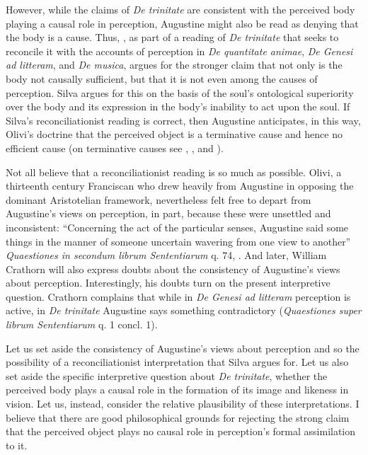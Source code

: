 \documentclass[12pt]{article}
\begin{document}
However, while the claims of \emph{De trinitate} are consistent with the perceived body playing a causal role in perception, Augustine might also be read as denying that the body is a cause. Thus, \citealt{Silva:2014bh}, as part of a reading of \emph{De trinitate} that seeks to reconcile it with the accounts of perception in \emph{De quantitate animae}, \emph{De Genesi ad litteram}, and \emph{De musica}, argues for the stronger claim that not only is the body not causally sufficient, but that it is not even among the causes of perception. Silva argues for this on the basis of the soul's ontological superiority over the body and its expression in the body's inability to act upon the soul. If Silva's \citeyearpar{Silva:2014bh} reconciliationist reading is correct, then Augustine anticipates, in this way, Olivi's doctrine that the perceived object is a terminative cause and hence no efficient cause (on terminative causes see \citealt[192--195]{Kent:1984zm}, \citealt[chapter 5.2]{Pasnau:1997aa}, and \citealt[chapter 6]{Toivanen:2013ul}).

Not all believe that a reconciliationist reading is so much as possible. Olivi, a thirteenth century Franciscan who drew heavily from Augustine in opposing the dominant Aristotelian framework, nevertheless felt free to depart from Augustine's views on perception, in part, because these were unsettled and inconsistent: ``Concerning the act of the particular senses, Augustine said some things in the manner of someone uncertain wavering from one view to another'' \emph{Quaestiones in secondum librum Sententiarum} q. 74, \citealt[131]{Pasnau:1997aa}. And later, William Crathorn will also express doubts about the consistency of Augustine's views about perception. Interestingly, his doubts turn on the present interpretive question. Crathorn complains that while in \emph{De Genesi ad litteram} perception is active, in \emph{De trinitate} Augustine says something contradictory (\emph{Quaestiones super librum Sententiarum} q. 1 concl. 1).

Let us set aside the consistency of Augustine's views about perception and so the possibility of a reconciliationist interpretation that Silva argues for. Let us also set aside the specific interpretive question about \emph{De trinitate}, whether the perceived body plays a causal role in the formation of its image and likeness in vision. Let us, instead, consider the relative plausibility of these interpretations.  I believe that there are good philosophical grounds for rejecting the strong claim that the perceived object plays no causal role in perception's formal assimilation to it.
\end{document}
